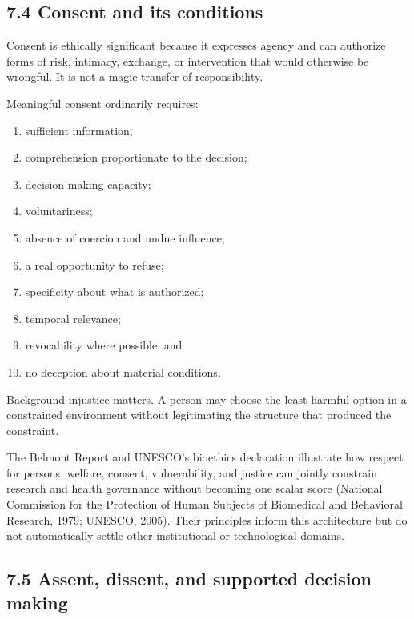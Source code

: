 \documentclass[
  11pt,
]{article}
\providecommand{\tightlist}{%
  \setlength{\itemsep}{0pt}\setlength{\parskip}{0pt}}
\begin{document}
\subsection{7.4 Consent and its
conditions}\label{consent-and-its-conditions}

Consent is ethically significant because it expresses agency and can
authorize forms of risk, intimacy, exchange, or intervention that would
otherwise be wrongful. It is not a magic transfer of responsibility.

Meaningful consent ordinarily requires:

\begin{enumerate}
\def\labelenumi{\arabic{enumi}.}
\tightlist
\item
  sufficient information;
\item
  comprehension proportionate to the decision;
\item
  decision-making capacity;
\item
  voluntariness;
\item
  absence of coercion and undue influence;
\item
  a real opportunity to refuse;
\item
  specificity about what is authorized;
\item
  temporal relevance;
\item
  revocability where possible; and
\item
  no deception about material conditions.
\end{enumerate}

Background injustice matters. A person may choose the least harmful
option in a constrained environment without legitimating the structure
that produced the constraint.

The Belmont Report and UNESCO's bioethics declaration illustrate how
respect for persons, welfare, consent, vulnerability, and justice can
jointly constrain research and health governance without becoming one
scalar score (National Commission for the Protection of Human Subjects
of Biomedical and Behavioral Research, 1979; UNESCO, 2005). Their
principles inform this architecture but do not automatically settle
other institutional or technological domains.

\subsection{7.5 Assent, dissent, and supported decision
making}\label{assent-dissent-and-supported-decision-making}
\end{document}
